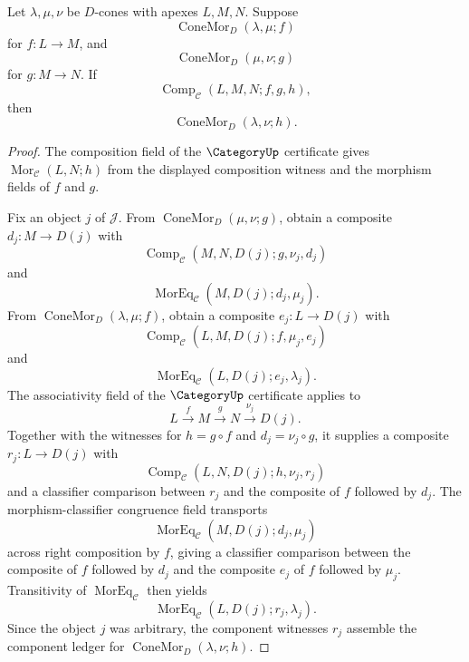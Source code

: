\begin{lemma}\label{lem:catlimit-cone-morphism-composite-closure}
Let $\lambda,\mu,\nu$ be $D$-cones with apexes $L,M,N$. Suppose
$$\operatorname{ConeMor}_{D}(\lambda,\mu;f)$$
for $f:L\to M$, and
$$\operatorname{ConeMor}_{D}(\mu,\nu;g)$$
for $g:M\to N$. If
$$\operatorname{Comp}_{\mathcal C}(L,M,N;f,g,h),$$
then
$$\operatorname{ConeMor}_{D}(\lambda,\nu;h).$$
\end{lemma}
\begin{proof}
The composition field of the $\CategoryUp$ certificate gives $\operatorname{Mor}_{\mathcal C}(L,N;h)$ from the displayed composition witness and the morphism fields of $f$ and $g$.

Fix an object $j$ of $\mathcal J$. From $\operatorname{ConeMor}_{D}(\mu,\nu;g)$, obtain a composite $d_j:M\to D(j)$ with
$$\operatorname{Comp}_{\mathcal C}(M,N,D(j);g,\nu_j,d_j)$$
and
$$\operatorname{MorEq}_{\mathcal C}(M,D(j);d_j,\mu_j).$$
From $\operatorname{ConeMor}_{D}(\lambda,\mu;f)$, obtain a composite $e_j:L\to D(j)$ with
$$\operatorname{Comp}_{\mathcal C}(L,M,D(j);f,\mu_j,e_j)$$
and
$$\operatorname{MorEq}_{\mathcal C}(L,D(j);e_j,\lambda_j).$$
The associativity field of the $\CategoryUp$ certificate applies to
$$L\xrightarrow{f}M\xrightarrow{g}N\xrightarrow{\nu_j}D(j).$$
Together with the witnesses for $h=g\circ f$ and $d_j=\nu_j\circ g$, it supplies a composite $r_j:L\to D(j)$ with
$$\operatorname{Comp}_{\mathcal C}(L,N,D(j);h,\nu_j,r_j)$$
and a classifier comparison between $r_j$ and the composite of $f$ followed by $d_j$. The morphism-classifier congruence field transports
$$\operatorname{MorEq}_{\mathcal C}(M,D(j);d_j,\mu_j)$$
across right composition by $f$, giving a classifier comparison between the composite of $f$ followed by $d_j$ and the composite $e_j$ of $f$ followed by $\mu_j$. Transitivity of $\operatorname{MorEq}_{\mathcal C}$ then yields
$$\operatorname{MorEq}_{\mathcal C}(L,D(j);r_j,\lambda_j).$$
Since the object $j$ was arbitrary, the component witnesses $r_j$ assemble the component ledger for $\operatorname{ConeMor}_{D}(\lambda,\nu;h)$.
\end{proof}

